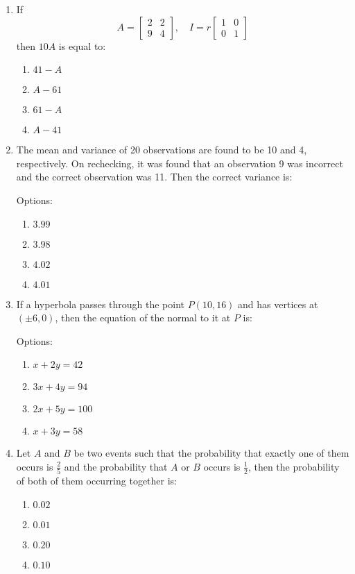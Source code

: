 \documentclass{article}
\begin{document}
\begin{enumerate}
\item If 
\[
A = \begin{bmatrix} 2 & 2 \\ 9 & 4 \end{bmatrix}, \quad I = r \begin{bmatrix} 1 & 0 \\ 0 & 1 \end{bmatrix}
\]
then $10A$ is equal to:


\begin{enumerate}
    \item $41 - A$
    \item $A - 61$
    \item $61 - A$
    \item $A - 41$
\end{enumerate}

\item The mean and variance of 20 observations are found to be 10 and 4, respectively. On rechecking, it was found that an observation 9 was incorrect and the correct observation was 11. Then the correct variance is:

Options:
\begin{enumerate}
    \item $3.99$
    \item $3.98$
    \item $4.02$
    \item $4.01$
\end{enumerate}

\item If a hyperbola passes through the point $P(10,16)$ and has vertices at $(\pm6,0)$, then the equation of the normal to it at $P$ is:

Options:
\begin{enumerate}
    \item $x + 2y = 42$
    \item $3x + 4y = 94$
    \item $2x + 5y =100$
    \item $x + 3y = 58$
\end{enumerate}

\item Let $A$ and $B$ be two events such that the probability that exactly one of them occurs is  $\frac{2}{5}$ and the probability that $A$ or $B$ occurs is $\frac{1}{2}$, then the probability of both of them occurring together is:  

\begin{enumerate}
    \item $0.02$
    \item $0.01$
    \item $0.20$
    \item $0.10$
\end{enumerate}



\end{enumerate}
\end{document}
